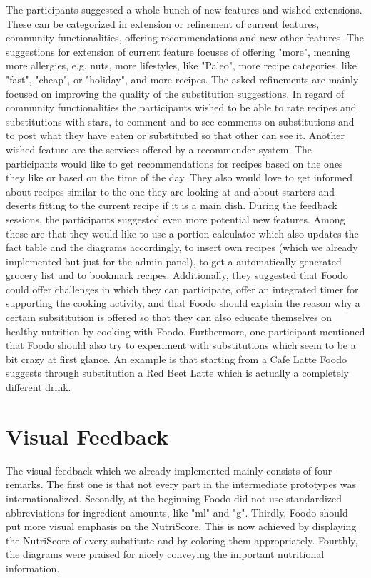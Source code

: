 The participants suggested a whole bunch of new features and wished extensions. These can be categorized in extension or refinement of current features, community functionalities, offering recommendations and new other features. The suggestions for extension of current feature focuses of offering "more", meaning more allergies, e.g. nuts, more lifestyles, like "Paleo", more recipe categories, like "fast", "cheap", or "holiday", and more recipes. The asked refinements are mainly focused on improving the quality of the substitution suggestions. In regard of community functionalities the participants wished to be able to rate recipes and substitutions with stars, to comment and to see comments on substitutions and to post what they have eaten or substituted so that other can see it. Another wished feature are the services offered by a recommender system. The participants would like to get recommendations for recipes based on the ones they like or based on the time of the day. They also would love to get informed about recipes similar to the one they are looking at and about starters and deserts fitting to the current recipe if it is a main dish. During the feedback sessions, the participants suggested even more potential new features. Among these are that they would like to use a portion calculator which also updates the fact table and the diagrams accordingly, to insert own recipes (which we already implemented but just for the admin panel), to get a automatically generated grocery list and to bookmark recipes. Additionally, they suggested that Foodo could offer challenges in which they can participate, offer an integrated timer for supporting the cooking activity, and that Foodo should explain the reason why a certain subsititution is offered so that they can also educate themselves on healthy nutrition by cooking with Foodo. Furthermore, one participant mentioned that Foodo should also try to experiment with substitutions which seem to be a bit crazy at first glance. An example is that starting from a Cafe Latte Foodo suggests through substitution a Red Beet Latte which is actually a completely different drink.
    
\section{Visual Feedback}


The visual feedback which we already implemented mainly consists of four remarks. The first one is that not every part in the intermediate prototypes was internationalized. Secondly, at the beginning Foodo did not use standardized abbreviations for ingredient amounts, like "ml" and "g". Thirdly, Foodo should put more visual emphasis on the NutriScore. This is now achieved by displaying the NutriScore of every substitute and by coloring them appropriately. Fourthly, the diagrams were praised for nicely conveying the important nutritional information. 

